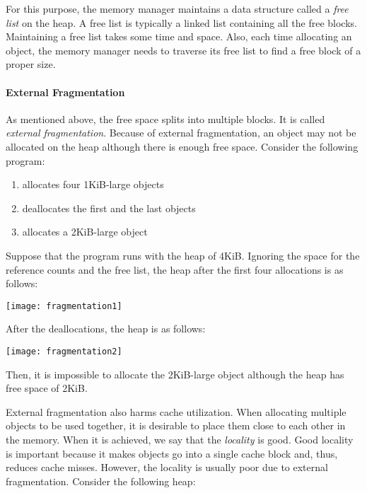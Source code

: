 For this purpose, the memory manager maintains a data structure called a
\textit{free list} on the heap. A free list is typically a
linked list containing all the free blocks. Maintaining a free list takes some
time and space. Also, each time allocating an object, the memory manager needs to
traverse its free list to find a free block of a proper size.

\paragraph{External Fragmentation}

As mentioned above, the free space splits into multiple blocks. It is called
\textit{external fragmentation}.  Because of
external fragmentation, an object may not be allocated on the heap although there is
enough free space. Consider the following program:

\begin{enumerate}
  \item allocates four 1KiB-large objects
  \item deallocates the first and the last objects
  \item allocates a 2KiB-large object
\end{enumerate}

Suppose that the program runs with the heap of 4KiB. Ignoring the space for
the reference counts and the free list, the heap after the first four
allocations is as follows:

\begin{center}
\texttt{[image: fragmentation1]}
\end{center}

After the deallocations, the heap is as follows:

\begin{center}
\texttt{[image: fragmentation2]}
\end{center}

Then, it is impossible to allocate the 2KiB-large object although the heap has
free space of 2KiB.

External fragmentation also harms cache utilization. When allocating multiple
objects to be used together, it is desirable to place them close to each other
in the memory.  When it is achieved, we say that the
\textit{locality} is good.  Good locality is important because
it makes objects go into a single cache block and, thus, reduces cache misses.
However, the locality is usually poor due to external fragmentation. Consider
the following heap:

